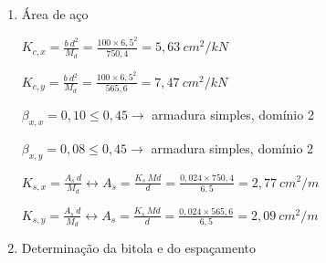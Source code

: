 \begin{resposta}
\begin{enumerate}[start=8]
\begin{enumerate}
            
            
            \item Área de aço
            
            $K_{c,x} = \frac{b \ d^2}{M_d} = \frac{100 \times 6,5^2}{750,4} = 5,63 \ cm^2/kN$
            
            $K_{c,y} = \frac{b \ d^2}{M_d} = \frac{100 \times 6,5^2}{565,6} = 7,47 \ cm^2/kN$ \newline

            $\beta_{x,x} = 0,10 \leq 0,45 \to$ armadura simples, domínio 2 \cite[tabela 1.1a]{tabelaskcks}

            $\beta_{x,y} = 0,08 \leq 0,45 \to$ armadura simples, domínio 2 \cite[tabela 1.1a]{tabelaskcks} \newline

            $K_{s,x} = \frac{A_s \ d}{M_d} \longleftrightarrow A_s = \frac{K_s \ Md}{d} = \frac{0,024 \times 750,4}{6,5} = 2,77 \ cm^2/m$

            $K_{s,y} = \frac{A_s \ d}{M_d} \longleftrightarrow A_s = \frac{K_s \ Md}{d} = \frac{0,024 \times 565,6}{6,5} = 2,09\ cm^2/m$ \newline

            \item Determinação da bitola e do espaçamento
            





\end{enumerate}
\end{enumerate}
\end{resposta}
